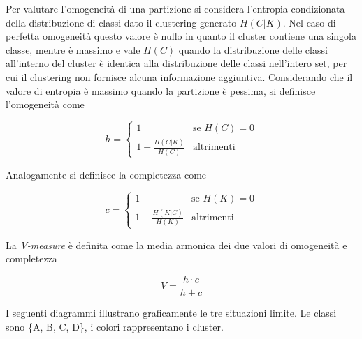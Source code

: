 \documentclass[12pt,a4paper,twoside]{report}
\begin{document}
Per valutare l'omogeneità di una partizione si considera l'entropia condizionata della distribuzione
di classi dato il clustering generato $H(C|K)$. Nel caso di perfetta omogeneità questo valore è
nullo in quanto il cluster contiene una singola classe, mentre è massimo e vale $H(C)$ quando la
distribuzione delle classi all'interno del cluster è identica alla distribuzione delle classi
nell'intero set, per cui il clustering non fornisce alcuna informazione aggiuntiva. Considerando che
il valore di entropia è massimo quando la partizione è pessima, si definisce l'omogeneità come

\begin{equation} \label{eq:h}
    h = \begin{cases} 1 & \mbox{se } H(C) = 0 \\ 1-\frac{H(C|K)}{H(C)} & \mbox{altrimenti} \end{cases}
\end{equation}

Analogamente si definisce la completezza come

\begin{equation} \label{eq:c}
    c = \begin{cases} 1 & \mbox{se } H(K) = 0 \\ 1-\frac{H(K|C)}{H(K)} & \mbox{altrimenti} \end{cases}
\end{equation}

La \textit{V-measure} è definita come la media armonica dei due valori di omogeneità e completezza

\begin{equation} \label{eq:v}
    V = \frac{h \cdot c}{h + c}
\end{equation}


I seguenti diagrammi illustrano graficamente le tre situazioni limite. Le classi sono \{A, B, C,
D\}, i colori rappresentano i cluster.
\end{document}
